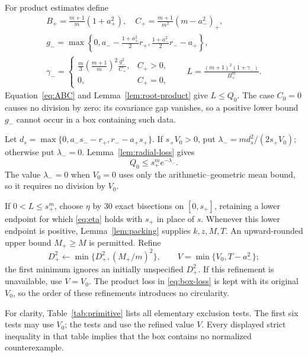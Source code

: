 \documentclass[11pt,reqno]{amsart}
\theoremstyle{definition}
\theoremstyle{remark}
\numberwithin{equation}{section}
\newcommand{\file}[1]{\texttt{\detokenize{#1}}}
\begin{document}
For product estimates define
\[
 \begin{gathered}
 B_+=\frac{m+1}{m}(1+a_+^2),\quad
 C_+=\frac{m+1}{m^2}(m-a_-^2)_+,\\
 g_- =\max\left\{0,a_--\frac{1+a_+^2}{2}r_+,
                   \frac{1+a_-^2}{2}r_--a_+\right\},\\
 \gamma_-=
 \begin{cases}
 \displaystyle\frac m3\left(\frac{m+1}{m}\right)^2\frac{g_-^2}{C_+},&C_+>0,\\
 0,&C_+=0,
 \end{cases}
 \qquad L=\frac{(m+1)^2(1+\gamma_-)}{B_+^m}.
 \end{gathered}
\]
Equation~\eqref{eq:ABC} and Lemma~\ref{lem:root-product} give $L\le Q_0$. The case $C_0=0$ causes no division by zero: its covariance gap vanishes, so a positive lower bound $g_-$ cannot occur in a box containing such data.

Let $d_s=\max\{0,a_-s_--r_+,r_--a_+s_+\}$. If $s_+V_0>0$, put $\lambda_-=md_s^2/(2s_+V_0)$; otherwise put $\lambda_-=0$. Lemma~\ref{lem:radial-loss} gives
\begin{equation}\label{eq:box-loss}
 Q_0\le s_+^m e^{-\lambda_-}.
\end{equation}
The value $\lambda_-=0$ when $V_0=0$ uses only the arithmetic--geometric mean bound, so it requires no division by $V_0$.

If $0<L\le s_+^m$, choose $\eta$ by $30$ exact bisections on $[0,s_+]$, retaining a lower endpoint for which \eqref{eq:eta} holds with $s_+$ in place of $s$. Whenever this lower endpoint is positive, Lemma~\ref{lem:packing} supplies $k,z,M,T$. An upward-rounded upper bound $M_+\ge M$ is permitted. Refine
\begin{equation}\label{eq:box-packed}
 D_+^2\leftarrow\min\{D_+^2,(M_+/m)^2\},\qquad
 V=\min\{V_0,T-a_-^2\};
\end{equation}
the first minimum ignores an initially unspecified $D_+^2$. If this refinement is unavailable, use $V=V_0$. The product loss in \eqref{eq:box-loss} is kept with its original $V_0$, so the order of these refinements introduces no circularity.

For clarity, Table~\ref{tab:primitive} lists all elementary exclusion tests. The first six tests may use $V_0$; the tests \file{moment_A_packed} and \file{moment_B_packed} use the refined value $V$. Every displayed strict inequality in that table implies that the box contains no normalized counterexample.
\end{document}
